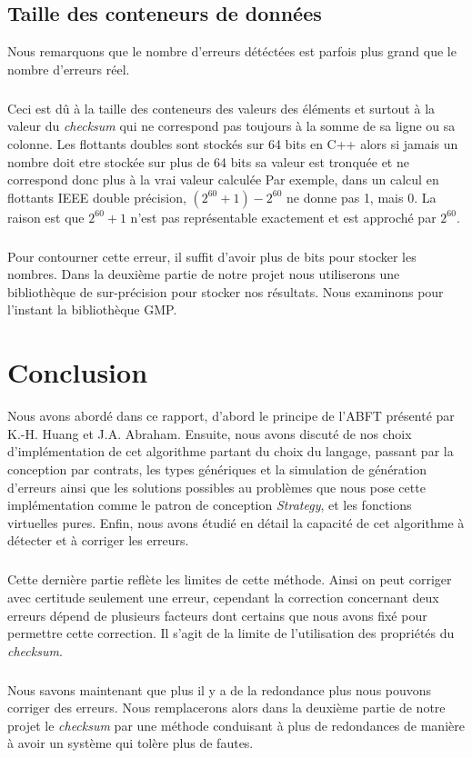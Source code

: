 \documentclass[a4paper,10pt]{report}
\begin{document}
\section{Taille des conteneurs de données}
Nous remarquons que le nombre d'erreurs détéctées est parfois plus grand que le nombre d'erreurs réel.
\paragraph*{}
Ceci est dû à la taille des conteneurs des valeurs des éléments et surtout à la valeur du \textit{checksum} qui ne
correspond pas toujours à la somme de sa ligne ou sa colonne. Les flottants doubles sont stockés sur 64 bits en C++ alors
si jamais un nombre doit etre stockée sur plus de 64 bits sa valeur est tronquée et ne correspond donc plus à la vrai
valeur calculée\newline
Par exemple, dans un calcul en flottants IEEE double précision, $(2^{60}+1)-2^{60}$  ne donne pas 1, mais 0. La raison est que 
$2^{60}+1$ n'est pas représentable exactement et est approché par $2^{60}$.
\paragraph*{}
Pour contourner cette erreur, il suffit d'avoir plus de bits pour stocker les nombres. Dans la deuxième partie de notre
projet nous utiliserons une bibliothèque de sur-précision pour stocker nos résultats. Nous examinons pour l'instant
la bibliothèque GMP.

\chapter*{Conclusion}
Nous avons abordé dans ce rapport, d'abord le principe de l'ABFT présenté par K.-H. Huang et J.A. Abraham. Ensuite, nous avons
discuté de nos choix d'implémentation de cet algorithme partant du choix du langage, passant par la conception par contrats,
les types génériques et la simulation de génération d'erreurs ainsi que les solutions possibles au problèmes que nous pose cette
implémentation comme le patron de conception \textit{Strategy}, et les fonctions virtuelles pures. Enfin, nous avons étudié en 
détail la capacité de cet algorithme à détecter et à corriger les erreurs.
\paragraph*{}
Cette dernière partie reflète les limites de cette méthode. Ainsi on peut corriger avec certitude seulement une erreur,
cependant la correction concernant deux erreurs dépend de plusieurs facteurs dont certains que nous avons fixé pour permettre
cette correction. Il s'agit de la limite de l'utilisation des propriétés du \textit{checksum}.
\paragraph*{}
Nous savons maintenant que plus il y a de la redondance plus nous pouvons corriger des erreurs.
Nous remplacerons alors dans la deuxième partie de notre projet le \textit{checksum} par une méthode conduisant à plus de 
redondances de manière à avoir un système qui tolère plus de fautes.
\end{document}
